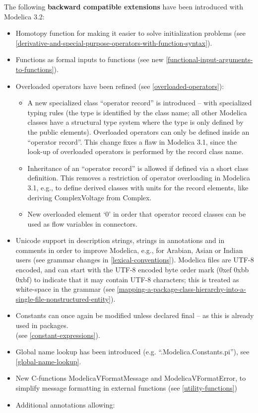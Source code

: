 \documentclass[10pt,a4paper]{report}
\begin{document}
The following \textbf{backward compatible extensions} have been
introduced with Modelica 3.2:

\begin{itemize}
\item
  Homotopy function for making it easier to solve initialization
  problems (see \ref{derivative-and-special-purpose-operators-with-function-syntax}).
\item
  Functions as formal inputs to functions (see new \ref{functional-input-arguments-to-functions}).
\item
  Overloaded operators have been refined (see \ref{overloaded-operators}):

  \begin{itemize}
  \item
    A new specialized class ``operator record'' is introduced -- with
    specialized typing rules (the type is identified by the class name;
    all other Modelica classes have a structural type system where the
    type is only defined by the public elements). Overloaded operators
    can only be defined inside an ``operator record''. This change fixes
    a flaw in Modelica 3.1, since the look-up of overloaded operators is
    performed by the record class name.
  \item
    Inheritance of an ``operator record'' is allowed if defined via a
    short class definition. This removes a restriction of operator
    overloading in Modelica 3.1, e.g., to define derived classes with
    units for the record elements, like deriving ComplexVoltage from
    Complex.
  \item
    New overloaded element `0' in order that operator record classes can
    be used as flow variables in connectors.
  \end{itemize}
\item
  Unicode support in description strings, strings in annotations and in
  comments in order to improve Modelica, e.g., for Arabian, Asian or
  Indian users (see grammar changes in \ref{lexical-conventions}). Modelica files are
  UTF-8 encoded, and can start with the UTF-8 encoded byte order mark
  (0xef 0xbb 0xbf) to indicate that it may contain UTF-8 characters;
  this is treated as white-space in the grammar (see \ref{mapping-a-package-class-hierarchy-into-a-single-file-nonstructured-entity}).
\item
  Constants can once again be modified unless declared final -- as this
  is already used in packages.\\
  (see \ref{constant-expressions}).
\item
  Global name lookup has been introduced (e.g.
  ``.Modelica.Constants.pi''), see \ref{global-name-lookup}.
\item
  New C-functions ModelicaVFormatMessage and ModelicaVFormatError, to
  simplify message formatting in external functions (see \ref{utility-functions})
\item
  Additional annotations allowing:


\end{itemize}
\end{document}
